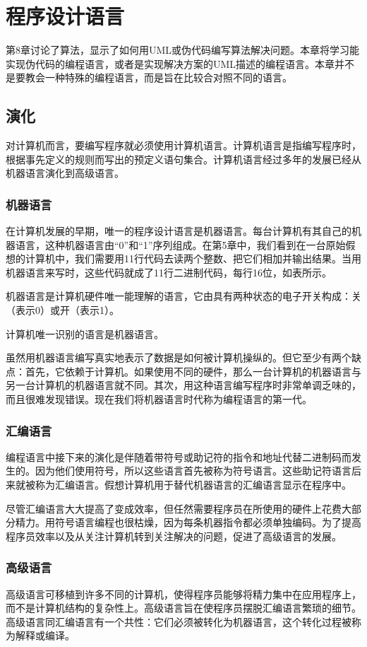 \chapter{程序设计语言}
第8章讨论了算法，显示了如何用UML或伪代码编写算法解决问题。本章将学习能实现伪代码的编程语言，或者是实现解决方案的UML描述的编程语言。本章并不是要教会一种特殊的编程语言，而是旨在比较合对照不同的语言。
\section{演化}
对计算机而言，要编写程序就必须使用计算机语言。计算机语言是指编写程序时，根据事先定义的规则而写出的预定义语句集合。计算机语言经过多年的发展已经从机器语言演化到高级语言。
\subsection{机器语言}
在计算机发展的早期，唯一的程序设计语言是机器语言。每台计算机有其自己的机器语言，这种机器语言由“0”和“1”序列组成。在第5章中，我们看到在一台原始假想的计算机中，我们需要用11行代码去读两个整数、把它们相加并输出结果。当用机器语言来写时，这些代码就成了11行二进制代码，每行16位，如表所示。

机器语言是计算机硬件唯一能理解的语言，它由具有两种状态的电子开关构成：关（表示0）或开（表示1）。

计算机唯一识别的语言是机器语言。

虽然用机器语言编写真实地表示了数据是如何被计算机操纵的。但它至少有两个缺点：首先，它依赖于计算机。如果使用不同的硬件，那么一台计算机的机器语言与另一台计算机的机器语言就不同。其次，用这种语言编写程序时非常单调乏味的，而且很难发现错误。现在我们将机器语言时代称为编程语言的第一代。
\subsection{汇编语言}
编程语言中接下来的演化是伴随着带符号或助记符的指令和地址代替二进制码而发生的。因为他们使用符号，所以这些语言首先被称为符号语言。这些助记符语言后来就被称为汇编语言。假想计算机用于替代机器语言的汇编语言显示在程序中。

尽管汇编语言大大提高了变成效率，但任然需要程序员在所使用的硬件上花费大部分精力。用符号语言编程也很枯燥，因为每条机器指令都必须单独编码。为了提高程序员效率以及从关注计算机转到关注解决的问题，促进了高级语言的发展。
\subsection{高级语言}
高级语言可移植到许多不同的计算机，使得程序员能够将精力集中在应用程序上，而不是计算机结构的复杂性上。高级语言旨在使程序员摆脱汇编语言繁琐的细节。高级语言同汇编语言有一个共性：它们必须被转化为机器语言，这个转化过程被称为解释或编译。

